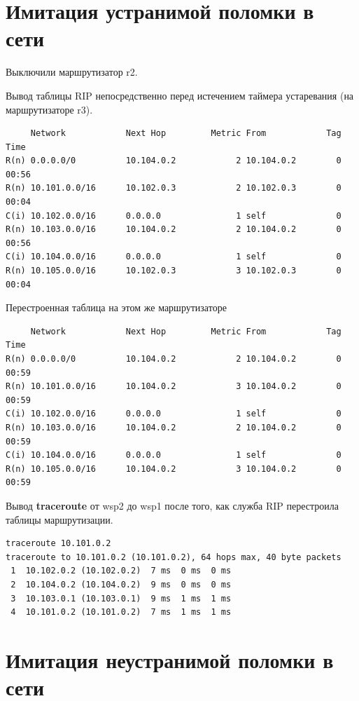 \documentclass[a4paper,12pt]{article}
\begin{document}
\section{Имитация устранимой поломки в сети}

Выключили маршрутизатор r2.

Вывод таблицы RIP непосредственно перед истечением таймера устаревания (на маршрутизаторе r3).

\begin{Verbatim}
     Network            Next Hop         Metric From            Tag Time
R(n) 0.0.0.0/0          10.104.0.2            2 10.104.0.2        0 00:56
R(n) 10.101.0.0/16      10.102.0.3            2 10.102.0.3        0 00:04
C(i) 10.102.0.0/16      0.0.0.0               1 self              0
R(n) 10.103.0.0/16      10.104.0.2            2 10.104.0.2        0 00:56
C(i) 10.104.0.0/16      0.0.0.0               1 self              0
R(n) 10.105.0.0/16      10.102.0.3            3 10.102.0.3        0 00:04
\end{Verbatim}

Перестроенная таблица на этом же маршрутизаторе

\begin{Verbatim}
     Network            Next Hop         Metric From            Tag Time
R(n) 0.0.0.0/0          10.104.0.2            2 10.104.0.2        0 00:59
R(n) 10.101.0.0/16      10.104.0.2            3 10.104.0.2        0 00:59
C(i) 10.102.0.0/16      0.0.0.0               1 self              0
R(n) 10.103.0.0/16      10.104.0.2            2 10.104.0.2        0 00:59
C(i) 10.104.0.0/16      0.0.0.0               1 self              0
R(n) 10.105.0.0/16      10.104.0.2            3 10.104.0.2        0 00:59
\end{Verbatim}


Вывод \textbf{traceroute} от wsp2 до wsp1 после того, как служба RIP перестроила таблицы маршрутизации.

\begin{Verbatim}
traceroute 10.101.0.2
traceroute to 10.101.0.2 (10.101.0.2), 64 hops max, 40 byte packets
 1  10.102.0.2 (10.102.0.2)  7 ms  0 ms  0 ms
 2  10.104.0.2 (10.104.0.2)  9 ms  0 ms  0 ms
 3  10.103.0.1 (10.103.0.1)  9 ms  1 ms  1 ms
 4  10.101.0.2 (10.101.0.2)  7 ms  1 ms  1 ms
\end{Verbatim}

\section{Имитация неустранимой поломки в сети}
\end{document}
